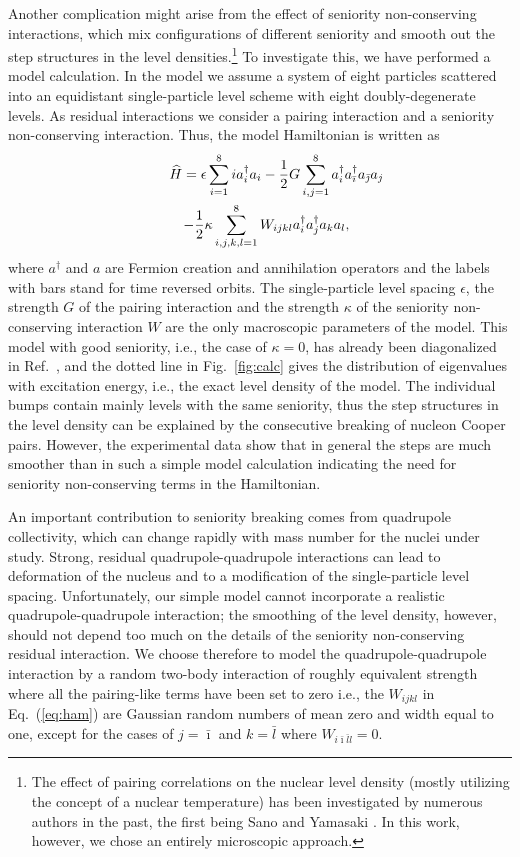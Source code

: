 \begin{multicols}{2}
Another complication might arise from the effect of seniority non-conserving
interactions, which mix configurations of different seniority and smooth out 
the step structures in the level densities.\footnote{The effect of pairing 
correlations on the nuclear level density (mostly utilizing the concept of a 
nuclear temperature) has been investigated by numerous authors in the past, the
first being Sano and Yamasaki \cite{SY63}. In this work, however, we chose an 
entirely microscopic approach.} To investigate this, we have performed a model 
calculation. In the model we assume a system of eight particles scattered into 
an equidistant single-particle level scheme with eight doubly-degenerate 
levels. As residual interactions we consider a pairing interaction and a 
seniority non-conserving interaction. Thus, the model Hamiltonian is written as
\begin{eqnarray}
\lefteqn{\widehat{H}=\epsilon\sum_{i=1}^8ia_i^\dagger a_i-\frac{1}{2}G
\sum_{i,j=1}^8a_i^\dagger a_{\bar{\imath}}^\dagger a_{\bar{\jmath}}a_j}
\nonumber\\
&&-\frac{1}{2}\kappa\sum_{i,j,k,l=1}^8W_{ijkl}a_i^\dagger a_j^\dagger 
a_ka_l,
\label{eq:ham}
\end{eqnarray}
where $a^\dagger$ and $a$ are Fermion creation and annihilation operators and 
the labels with bars stand for time reversed orbits. The single-particle level
spacing $\epsilon$, the strength $G$ of the pairing interaction and the 
strength $\kappa$ of the seniority non-conserving interaction $W$ are the only 
macroscopic parameters of the model. This model with good seniority, i.e., the 
case of $\kappa=0$, has already been diagonalized in Ref.\ \cite{GB00}, and the
dotted line in Fig.\ \ref{fig:calc} gives the distribution of eigenvalues with 
excitation energy, i.e., the exact level density of the model. The individual 
bumps contain mainly levels with the same seniority, thus the step structures 
in the level density can be explained by the consecutive breaking of nucleon 
Cooper pairs. However, the experimental data show that in general the steps are
much smoother than in such a simple model calculation indicating the need for 
seniority non-conserving terms in the Hamiltonian.

An important contribution to seniority breaking comes from quadrupole 
collectivity, which can change rapidly with mass number for the nuclei under 
study. Strong, residual quadrupole-quadrupole interactions can lead to 
deformation of the nucleus and to a modification of the single-particle level 
spacing. Unfortunately, our simple model cannot incorporate a realistic 
quadrupole-quadrupole interaction; the smoothing of the level density, however,
should not depend too much on the details of the seniority non-conserving 
residual interaction. We choose therefore to model the quadrupole-quadrupole 
interaction by a random two-body interaction \cite{MF75} of roughly equivalent 
strength where all the pairing-like terms have been set to zero i.e., the 
$W_{ijkl}$ in Eq.\ (\ref{eq:ham}) are Gaussian random numbers of mean zero and 
width equal to one, except for the cases of $j=\bar{\imath}$ and $k=\bar{l}$ 
where $W_{i\bar{\imath}\bar{l}l}=0$.


\end{multicols}
